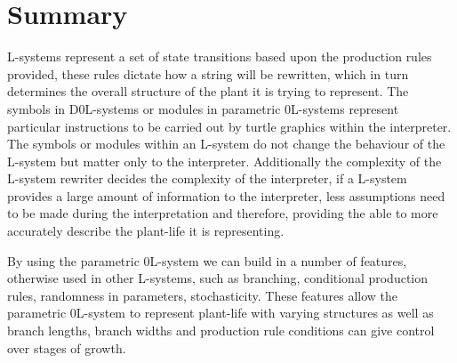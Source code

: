 \section{Summary}

L-systems represent a set of state transitions based upon the production rules provided, these rules dictate how a string will be rewritten, which in turn determines the overall structure of the plant it is trying to represent. The symbols in D0L-systems or modules in parametric 0L-systems represent particular instructions to be carried out by turtle graphics within the interpreter. The symbols or modules within an L-system do not change the behaviour of the L-system but matter only to the interpreter. Additionally the complexity of the L-system rewriter decides the complexity of the interpreter, if a L-system provides a large amount of information to the interpreter, less assumptions need to be made during the interpretation and therefore, providing the able to more accurately describe the plant-life it is representing.

By using the parametric 0L-system we can build in a number of features, otherwise used in other L-systems, such as branching, conditional production rules, randomness in parameters, stochasticity. These features allow the parametric 0L-system to represent plant-life with varying structures as well as branch lengths, branch widths and production rule conditions can give control over stages of growth.

